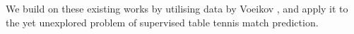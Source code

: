 We build on these existing works by utilising data by Voeikov \etal \cite{voeikov2020ttnet}, and apply it to the yet unexplored problem of supervised table tennis match prediction.



